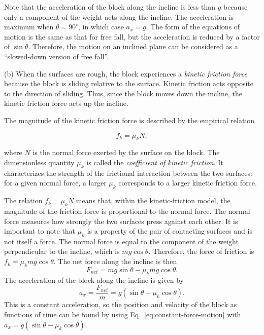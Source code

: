 \documentclass[12pt]{article}
\begin{document}
Note that the acceleration of the block along the incline is less than $g$ because only a component of the weight acts along the incline. The acceleration is maximum when $\theta = 90^\circ$, in which case $a_x = g$. The form of the equations of motion is the same as that for free fall, but the acceleration is reduced by a factor of $\sin\theta$. Therefore, the motion on an inclined plane can be considered as a ``slowed-down version of free fall''.

(b) When the surfaces are rough, the block experiences a \emph{kinetic friction force} because the block is sliding relative to the surface. Kinetic friction acts opposite to the direction of sliding. Thus, since the block moves down the incline, the kinetic friction force acts up the incline.

The magnitude of the kinetic friction force is described by the empirical relation

\begin{equation}
f_k=\mu_k N,
\end{equation}

where $N$ is the normal force exerted by the surface on the block. The dimensionless quantity $\mu_k$ is called the \emph{coefficient of kinetic friction}. It characterizes the strength of the frictional interaction between the two surfaces: for a given normal force, a larger $\mu_k$ corresponds to a larger kinetic friction force.

The relation $f_k=\mu_kN$ means that, within the kinetic-friction model, the magnitude of the friction force is proportional to the normal force. The normal force measures how strongly the two surfaces press against each other. It is important to note that $\mu_k$ is a property of the pair of contacting surfaces and is not itself a force. The normal force is equal to the component of the weight perpendicular to the incline, which is $mg\cos\theta$. Therefore, the force of friction is $f_k = \mu_k mg\cos\theta$. The net force along the incline is then
\begin{equation}
    F_{net} = mg\sin\theta - \mu_k mg\cos\theta.
\end{equation}
The acceleration of the block along the incline is given by
\begin{equation}
    a_x = \frac{F_{net}}{m} = g(\sin\theta - \mu_k \cos\theta).
\end{equation}
This is a constant acceleration, so the position and velocity of the block as functions of time can be found by using Eq.~\eqref{eq:constant-force-motion} with $a_x = g(\sin\theta - \mu_k \cos\theta)$.
\end{document}
